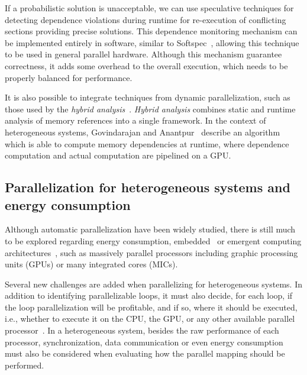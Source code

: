 \documentclass[a4paper,12pt]{article}
\begin{document}
If a probabilistic solution is unacceptable, we can use speculative techniques
for detecting dependence violations during runtime for re-execution of
conflicting sections providing precise solutions.  This dependence monitoring
mechanism can be implemented entirely in software, similar to
Softspec~\cite{bruening98}, allowing this technique to be used in general
parallel hardware.  Although this mechanism guarantee correctness, it adds some
overhead to the overall execution, which needs to be properly balanced for
performance.

It is also possible to integrate techniques from dynamic parallelization, such
as those used by the \emph{hybrid analysis}~\cite{rus03}. \emph{Hybrid
analysis} combines static and runtime analysis of memory references into a
single framework.  In the context of heterogeneous systems, Govindarajan and
Anantpur~\cite{govindarajan13} describe an algorithm which is able to compute
memory dependencies at runtime, where dependence computation and actual
computation are pipelined on a GPU.

\subsection{Parallelization for heterogeneous systems and energy consumption}

Although automatic parallelization have been widely studied, there is still
much to be explored regarding energy consumption, embedded~\cite{cordes10} or
emergent computing
architectures~\cite{leung09,baskaran10,amini12,govindarajan13}, such as
massively parallel processors including graphic processing units (GPUs) or many
integrated cores (MICs).

Several new challenges are added when parallelizing for heterogeneous systems.
In addition to identifying parallelizable loops, it must also decide, for each
loop, if the loop parallelization will be profitable, and if so, where it
should be executed, i.e., whether to execute it on the CPU, the GPU, or any
other available parallel processor~\cite{tournavitis09,wang14a,leung09}.  In a
heterogeneous system, besides the raw performance of each processor,
synchronization, data communication or even energy consumption must also be
considered when evaluating how the parallel mapping should be performed.



\end{document}
